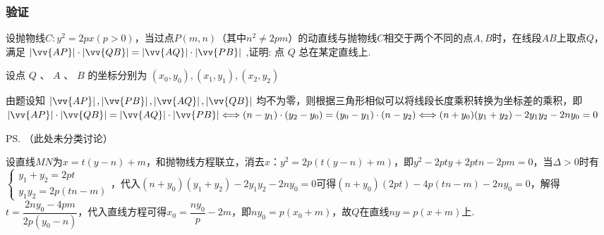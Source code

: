 \subsubsection*{验证}
设抛物线$C: y^2 = 2px(p > 0)$，当过点$P(m,n)$（其中$n^2 \neq 2pm$）的动直线与抛物线$C$相交于两个不同的点$A,B$时，在线段$AB$上取点$Q$，满足 $\left| \vv{AP}\right|  \cdot  \left| \vv{QB}\right|  = \left| \vv{AQ}\right|  \cdot  \left| \vv{PB}\right|$ ,证明: 点 $Q$ 总在某定直线上.
\begin{jieda}
    设点 ${Q}\text{ 、 }{A}\text{ 、 }{B}$ 的坐标分别为 $\left( x_0, y_0\right) ,\left( {{x}_{1},{y}_{1}}\right) ,\left( {{x}_{2},{y}_{2}}\right)$

    由题设知 $\left| \vv{AP}\right| ,\left| \vv{PB}\right| ,\left| \vv{AQ}\right| ,\left| \vv{QB}\right|$ 均不为零，则根据三角形相似可以将线段长度乘积转换为坐标差的乘积，即$\left| \vv{AP}\right|  \cdot  \left| \vv{QB}\right|  = \left| \vv{AQ}\right|  \cdot  \left| \vv{PB}\right| \Longleftrightarrow  (n-y_1) \cdot (y_2-y_0) = (y_0-y_1) \cdot (n-y_2) \Longleftrightarrow (n+y_0)(y_1+y_2) - 2y_1y_2-2ny_0 = 0$
    
    \ps （此处未分类讨论）

    设直线$MN$为$x = t(y-n)+m$，和抛物线方程联立，消去$x$：$y^2 = 2p(t(y-n)+m)$，即$y^2 - 2pty+2ptn-2pm = 0$，当$\Delta > 0$时有$\left \{\begin{array}{l}
         y_1+y_2 = 2pt  \\
         y_1y_2 = 2p(tn-m)
    \end{array}\right.$，代入$(n+y_0)(y_1+y_2) - 2y_1y_2-2ny_0 = 0$可得$(n+y_0)(2pt) - 4p(tn-m)-2ny_0 = 0$，解得$t = \dfrac{2ny_0-4pm}{2p(y_0-n)}$，代入直线方程可得$x_0 = \dfrac{ny_0}{p}-2m$，即$ny_0 = p(x_0+m)$，故$Q$在直线$ny = p(x+m)$上.

\end{jieda}
\begin{vspace_}
\vsp[9]
\end{vspace_}

